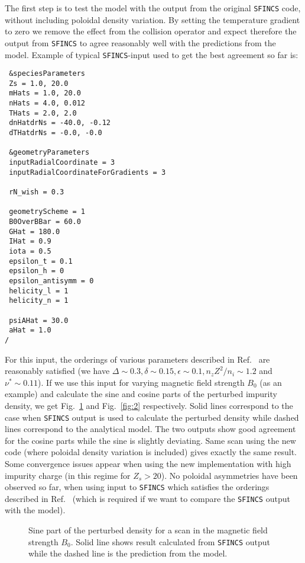 \documentclass[12pt]{article}
\begin{document}
The first step is to test the model with the output from the original \texttt{SFINCS} code, without including poloidal density variation. By setting the temperature gradient to zero we remove the effect from the collision operator and expect therefore the output from \texttt{SFINCS} to agree reasonably well with the predictions from the model. Example of typical \texttt{SFINCS}-input used to get the best agreement so far is:
 \begin{lstlisting}
 &speciesParameters
 Zs = 1.0, 20.0
 mHats = 1.0, 20.0
 nHats = 4.0, 0.012
 THats = 2.0, 2.0
 dnHatdrNs = -40.0, -0.12
 dTHatdrNs = -0.0, -0.0
 
 &geometryParameters
 inputRadialCoordinate = 3
 inputRadialCoordinateForGradients = 3

 rN_wish = 0.3

 geometryScheme = 1
 B0OverBBar = 60.0
 GHat = 180.0
 IHat = 0.9
 iota = 0.5
 epsilon_t = 0.1
 epsilon_h = 0
 epsilon_antisymm = 0
 helicity_l = 1
 helicity_n = 1

 psiAHat = 30.0
 aHat = 1.0
/
  \end{lstlisting}
\noindent
For this input, the orderings of various parameters described in Ref.~\cite{ref:Fulop} are reasonably satisfied (we have $\Delta\sim 0.3, \delta \sim 0.15, \epsilon \sim 0.1, n_zZ^2/n_i \sim 1.2$ and $\nu^*\sim 0.11$). If we use this input for varying magnetic field strength $B_0$ (as an example) and calculate the sine and cosine parts of the perturbed impurity density, we get Fig.~\ref{fig:1} and Fig.~\ref{fig:2} respectively. Solid lines correspond to the case when \texttt{SFINCS} output is used to calculate the perturbed density while dashed lines correspond to the analytical model. The two outputs show good agreement for the cosine parts while the sine is slightly deviating. Same scan using the new code (where poloidal density variation is included) gives exactly the same result. Some convergence issues appear when using the new implementation with high impurity charge (in this regime for $Z_s > 20$). No poloidal asymmetries have been observed so far, when using input to \texttt{SFINCS} which satisfies the orderings described in  Ref.~\cite{ref:Fulop} (which is required if we want to compare the \texttt{SFINCS} output with the model). 

\begin{figure}[H]
 \setlength\figureheight{0.3\textheight}
 \setlength{}
    \centering
    
    \caption{Sine part of the perturbed density for a scan in the magnetic field strength $B_0$. Solid line shows result calculated from \texttt{SFINCS} output while the dashed line is the prediction from the model.}
            \label{fig:1}
      \end{figure}  
  
\end{document}
